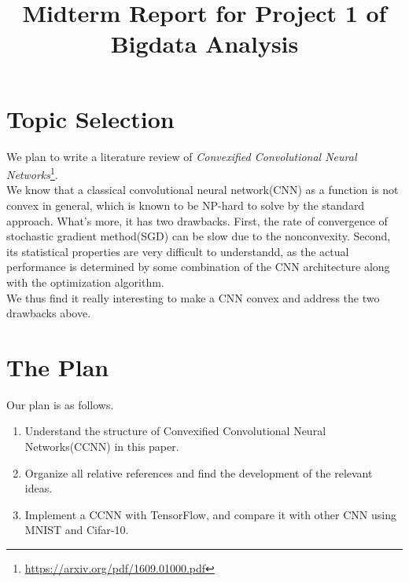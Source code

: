 \documentclass{article}
\title{Midterm Report for Project 1 of Bigdata Analysis}
\author{}
\begin{document}
	\maketitle
	\section{Topic Selection}
	We plan to write a literature review of \emph{Convexified Convolutional Neural Networks}\footnote{\url{https://arxiv.org/pdf/1609.01000.pdf}}.\\
	We know that a classical convolutional neural network(CNN) as a function is not convex in general, which is known to be NP-hard to solve by the standard approach. What's more, it has two drawbacks. First, the rate of convergence of stochastic gradient method(SGD) can be slow due to the nonconvexity. Second, its
	statistical properties are very difficult to understandd, as the actual performance is determined by
	some combination of the CNN architecture along with the optimization algorithm.\\
	We thus find it really interesting to make a CNN convex and address the two drawbacks above.\\
	\section{The Plan}
	Our plan is as follows.
	\begin{enumerate}
		\item Understand the structure of Convexified Convolutional Neural Networks(CCNN) in this paper.
		\item Organize all relative references and find the development of the relevant ideas.
		\item Implement a CCNN with TensorFlow, and compare it with other CNN using MNIST and Cifar-10.
	\end{enumerate}
	
\end{document}
